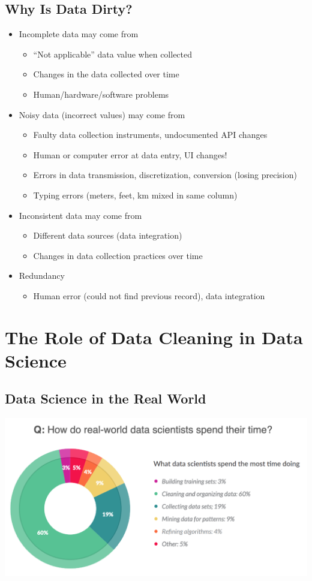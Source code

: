 \documentclass[11pt]{article}
\theoremstyle{definition}
\begin{document}
\subsection{Why Is Data Dirty?}
\begin{itemize}
    \item Incomplete data may come from
    \begin{itemize}
        \item “Not applicable” data value when collected
        \item Changes in the data collected over time
        \item Human/hardware/software problems
    \end{itemize}
    \item Noisy data (incorrect values) may come from
    \begin{itemize}
        \item Faulty data collection instruments, undocumented API changes
        \item Human or computer error at data entry, UI changes!
        \item Errors in data transmission, discretization, conversion (losing precision)
        \item Typing errors (meters, feet, km mixed in same column)
    \end{itemize}
    \item Inconsistent data may come from
    \begin{itemize}
        \item Different data sources (data integration)
        \item Changes in data collection practices over time
    \end{itemize}
    \item Redundancy
    \begin{itemize}
        \item Human error (could not find previous record), data integration
    \end{itemize}
\end{itemize}
\section{The Role of Data Cleaning in
Data Science}
\subsection{Data Science in the Real World}
\includegraphics[width=\textwidth]{3.png}
\end{document}
